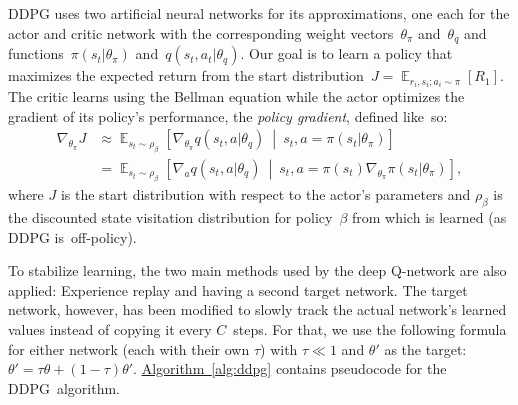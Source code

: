 \documentclass[a4paper,titlepage]{article}
\DeclareMathOperator{\Expectation}{\mathbb{E}}
\newcommand{\Exp}[3]{\Expectation_{#1} \left[ #2 \ \middle| \ #3 \right]}
\newcommand{\Ex}[2]{\Expectation_{#1} \left[ #2 \right]}
\begin{document}
DDPG uses two artificial neural networks for its approximations, one each for the actor and critic network with the corresponding weight vectors~$\theta_\pi$ and~$\theta_q$ and functions~$\pi(s_t | \theta_\pi)$ and~$q(s_t, a_t | \theta_q)$. Our goal is to learn a policy that maximizes the expected return from the start distribution~$J = \Ex{r_i, s_i; a_i \sim \pi}{R_1}$. The critic learns using the Bellman equation while the actor optimizes the gradient of its policy's performance, the \emph{policy gradient}, defined like~so:
\begin{align*}
  \nabla_{\theta_\pi} J &\approx \Exp{s_t \sim \rho_\beta}{\nabla_{\theta_\pi} q(s_t, a | \theta_q)}{s_t, a = \pi(s_t | \theta_\pi)} \\
  &= \Exp{s_t \sim \rho_\beta}{\nabla_a q(s_t, a | \theta_q)}{s_t, a = \pi(s_t) \nabla_{\theta_\pi} \pi(s_t | \theta_\pi)},
\end{align*}
where $J$ is the start distribution with respect to the actor's parameters and $\rho_\beta$ is the discounted state visitation distribution for policy~$\beta$ from which is learned (as DDPG is~off-policy).

To stabilize learning, the two main methods used by the deep Q-network are also applied: Experience replay and having a second target network. The target network, however, has been modified to slowly track the actual network's learned values instead of copying it every $C$~steps. For that, we use the following formula for either network (each with their own $\tau$) with $\tau \ll 1$ and $\theta'$ as the target: $\theta' = \tau \theta + (1 - \tau) \theta'$. \hyperref[alg:ddpg]{Algorithm~\ref*{alg:ddpg}} contains pseudocode for the DDPG~algorithm.
\end{document}
